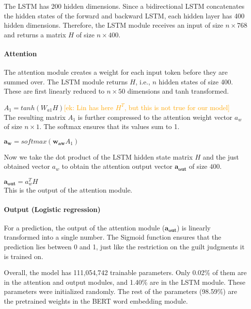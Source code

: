 \documentclass[11pt,a4paper]{article}
\newcommand{\ek}[1]{\textcolor{Orange}{[ek: #1]}}
\begin{document}
The LSTM has 200 hidden dimensions. Since a bidirectional LSTM concatenates the hidden states of the forward and backward LSTM, each hidden layer has 400 hidden dimensions. 
Therefore, the LSTM module receives an input of size $n \times 768$ and returns a matrix $H$ of size $n \times 400$.

\paragraph{Attention}
The attention module creates a weight for each input token before they are summed over. 
The LSTM module returns $H$, i.e., $n$ hidden states of size 400. These are first linearly reduced to $n \times 50$ dimensions and tanh transformed. 

$A_1 = tanh(W_{a1} H)$\ek{Lin has here $H^T$, but this is not true for our model}\\
The resulting matrix $A_1$ is further compressed to the attention weight vector $a_w$ of size $n \times 1$. The softmax ensures that its values sum to 1.

$\mathbf{a_w} = softmax(\mathbf{w_{aw}} A_1)$

Now we take the dot product of the LSTM hidden state matrix $H$ and the just obtained vector $a_w$ to obtain the attention output vector $\mathbf{a_{out}}$ of size $400$. 

$\mathbf{a_{out}} = a_w^T H$\\
This is the output of the attention module.

\paragraph{Output (Logistic regression)}
For a prediction, the output of the attention module ($\mathbf{a_{out}}$) is linearly transformed into a single number. 
The Sigmoid function ensures that the prediction lies between 0 and 1, just like the restriction on the guilt judgments it is trained on.


Overall, the model has 111,054,742 trainable parameters. Only 0.02\% of them are in the attention and output modules, and 1.40\% are in the LSTM module. These parameters were initialized randomly. The rest of the parameters (98.59\%) are the pretrained weights in the BERT word embedding module.
\end{document}
